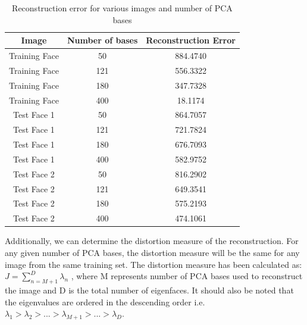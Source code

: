 \documentclass[10pt,twocolumn,letterpaper]{article}
\begin{document}
\begin{table}[H]
\begin{center}
\begin{tabular}{||c c c||}
\hline
\bf Image & \bf Number of bases & \bf Reconstruction Error\\ [0.5ex]
\hline \hline
Training Face & 50 & 884.4740 \\ [0.5ex]
\hline
Training Face & 121 & 556.3322\\ [0.5ex]
\hline
Training Face & 180 & 347.7328\\ [0.5ex]
\hline
Training Face & 400 & 18.1174\\ [0.5ex]
\hline \hline
Test Face 1 & 50 & 864.7057\\ [0.5ex]
\hline
Test Face 1 & 121 & 721.7824\\ [0.5ex]
\hline
Test Face 1 & 180 & 676.7093\\ [0.5ex]
\hline
Test Face 1 & 400 & 582.9752\\ [0.5ex]
\hline \hline
Test Face 2 & 50 & 816.2902\\ [0.5ex]
\hline
Test Face 2 & 121 & 649.3541\\ [0.5ex]
\hline
Test Face 2 & 180 & 575.2193\\ [0.5ex]
\hline
Test Face 2 & 400 & 474.1061\\ [0.5ex]
\hline
\end{tabular}
\end{center}
\caption{Reconstruction error for various images and number of PCA bases} \label{tab:RecoError}
\end{table}

Additionally, we can determine the distortion measure of the reconstruction. For any given number of PCA bases, the distortion measure will be the same for any image from the same training set. The distortion measure has been calculated as:
$J = \sum_{n=M+1}^{D} \lambda_n$
, where M represents number of PCA bases used to reconstruct the image and D is the total number of eigenfaces. It should also be noted that the eigenvalues are ordered in the descending order i.e. $\lambda_1 > \lambda_2 > ... > \lambda_{M+1} > ... > \lambda_D$.
\end{document}
